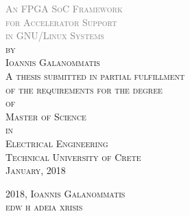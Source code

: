 \thispagestyle{empty}
\begin{center}
	\textsc{
	\textcolor{gray} {\Huge
		An FPGA SoC Framework \\
		for Accelerator Support \\
		in GNU/Linux Systems\\
	}
	\vspace{50pt}
	by\\
	\vspace{20pt}
	\large Ioannis Galanommatis\\
	\vspace{80pt}
		A thesis submitted in partial fulfillment\\
		of the requirements for the degree\\
		\vspace{12pt}
		of\\
		\vspace{12pt}
		{\large Master of Science\\}
		\vspace{12pt}
		in\\
		\vspace{12pt}
		{\large Electrical Engineering\\}
	}
	\vspace*{\fill}
	\textsc{\large Technical University of Crete\\January, 2018\\}
	
\end{center}

\newpage

\thispagestyle{empty}
\vspace*{\fill}
\scshape \noindent \small 2018, Ioannis Galanommatis \\
\noindent edw h adeia xrisis
\vspace*{\fill}

